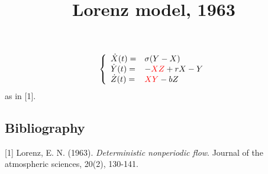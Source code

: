 \documentclass[12pt,a4paper]{article}
\title{Lorenz model, 1963}
\date{}
\begin{document}
\maketitle

\begin{equation*}
\left\{
\begin{array}{ll}
  \dot{X}(t) = & \sigma(Y-X) \\
  \dot{Y}(t) = & -{\color{red}{XZ}} + rX -Y \\
  \dot{Z}(t) = & {\color{red}{XY}} - bZ 
\end{array} \right.
\end{equation*}
as in [1].

\subsection*{Bibliography}
[1] Lorenz, E. N. (1963). \emph{Deterministic nonperiodic flow}. Journal of the atmospheric sciences, 20(2), 130-141.

\end{document}
